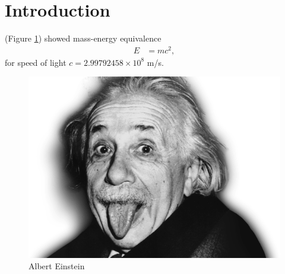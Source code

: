 
\section{Introduction}
\label{sec:introduction}

\cite{einstein} (Figure \ref{fig:einstein}) showed mass-energy
equivalence
%
\begin{align}
  \label{eq:1}
  E &= mc^2,
\end{align}
%
for speed of light $c= 2.99792458 \times 10^{8}$ m/s.

\begin{figure}[!h]
  \centering
  \includegraphics[scale=0.25]{figures/einstein.png}
  \caption{Albert Einstein}
  \label{fig:einstein}
\end{figure}

